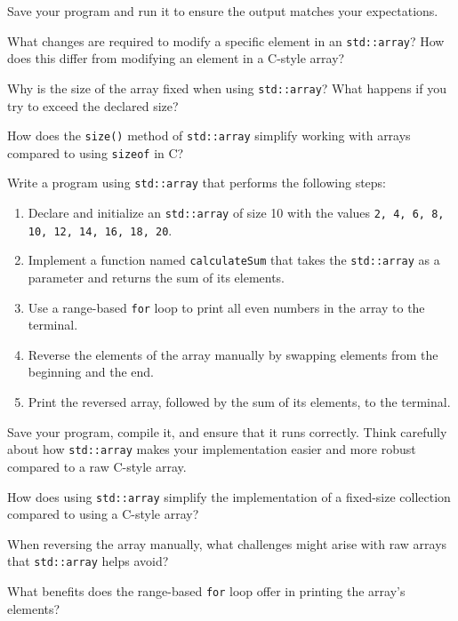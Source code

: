 \begin{challenge}
\begin{task}
        Save your program and run it to ensure the output matches your expectations.
        
        \begin{questions}
            \item What changes are required to modify a specific element in an \texttt{std::array}? How does this differ from modifying an element in a C-style array?
            \item Why is the size of the array fixed when using \texttt{std::array}? What happens if you try to exceed the declared size?
            \item How does the \texttt{size()} method of \texttt{std::array} simplify working with arrays compared to using \texttt{sizeof} in C?
        \end{questions}
    \end{task}


    \begin{task}
        Write a program using \texttt{std::array} that performs the following steps:
        \begin{enumerate}
            \item Declare and initialize an \texttt{std::array} of size 10 with the values \texttt{2, 4, 6, 8, 10, 12, 14, 16, 18, 20}.
            \item Implement a function named \texttt{calculateSum} that takes the \texttt{std::array} as a parameter and returns the sum of its elements.
            \item Use a range-based \texttt{for} loop to print all even numbers in the array to the terminal.
            \item Reverse the elements of the array manually by swapping elements from the beginning and the end.
            \item Print the reversed array, followed by the sum of its elements, to the terminal.
        \end{enumerate}
        
        Save your program, compile it, and ensure that it runs correctly. Think carefully about how \texttt{std::array} makes your implementation easier and more robust compared to a raw C-style array.
        
        \begin{questions}
            \item How does using \texttt{std::array} simplify the implementation of a fixed-size collection compared to using a C-style array?
            \item When reversing the array manually, what challenges might arise with raw arrays that \texttt{std::array} helps avoid?
            \item What benefits does the range-based \texttt{for} loop offer in printing the array's elements?
        \end{questions}
    \end{task}
        


\end{challenge}
